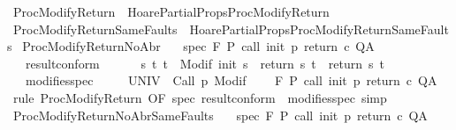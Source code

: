 \begin{isabellebody}
\isanewline
{}\isamarkupfalse%
\ ProcModifyReturn\ {\isacharequal}\ HoarePartialProps{\isachardot}ProcModifyReturn\ \isanewline
{}\isamarkupfalse%
\ ProcModifyReturnSameFaults\ {\isacharequal}\ HoarePartialProps{\isachardot}ProcModifyReturnSameFaults\isanewline
\isanewline
{}\isamarkupfalse%
\ ProcModifyReturnNoAbr{\isacharcolon}\isanewline
\ \ \ spec{\isacharcolon}\ {\isachardoublequoteopen}{\isasymGamma}{\isacharcomma}{\isasymTheta}{\isasymturnstile}\isactrlbsub {\isacharslash}F\isactrlesub \ P\ {\isacharparenleft}call\ init\ p\ return{\isacharprime}\ c{\isacharparenright}\ Q{\isacharcomma}A{\isachardoublequoteclose}\isanewline
\ \ \ result{\isacharunderscore}conform{\isacharcolon}\isanewline
\ \ \ \ \ \ {\isachardoublequoteopen}{\isasymforall}s\ t{\isachardot}\ t\ {\isasymin}\ Modif\ {\isacharparenleft}init\ s{\isacharparenright}\ {\isasymlongrightarrow}\ {\isacharparenleft}return{\isacharprime}\ s\ t{\isacharparenright}\ {\isacharequal}\ {\isacharparenleft}return\ s\ t{\isacharparenright}{\isachardoublequoteclose}\isanewline
\ \ \ modifies{\isacharunderscore}spec{\isacharcolon}\ \ \isanewline
\ \ {\isachardoublequoteopen}{\isasymforall}{\isasymsigma}{\isachardot}\ {\isasymGamma}{\isacharcomma}{\isasymTheta}{\isasymturnstile}\isactrlbsub {\isacharslash}UNIV\isactrlesub \ {\isacharbraceleft}{\isasymsigma}{\isacharbraceright}\ Call\ p\ {\isacharparenleft}Modif\ {\isasymsigma}{\isacharparenright}{\isacharcomma}{\isacharbraceleft}{\isacharbraceright}{\isachardoublequoteclose}\isanewline
\ \ \ {\isachardoublequoteopen}{\isasymGamma}{\isacharcomma}{\isasymTheta}{\isasymturnstile}\isactrlbsub {\isacharslash}F\isactrlesub \ P\ {\isacharparenleft}call\ init\ p\ return\ c{\isacharparenright}\ Q{\isacharcomma}A{\isachardoublequoteclose}\isanewline
%
\isadelimproof
%
\endisadelimproof
%
\isatagproof
{}\isamarkupfalse%
\ {\isacharparenleft}rule\ ProcModifyReturn\ {\isacharbrackleft}OF\ spec\ result{\isacharunderscore}conform\ {\isacharunderscore}\ modifies{\isacharunderscore}spec{\isacharbrackright}{\isacharparenright}\ simp%
\endisatagproof
{\isafoldproof}%
%
\isadelimproof
\isanewline
%
\endisadelimproof
\isanewline
{}\isamarkupfalse%
\ ProcModifyReturnNoAbrSameFaults{\isacharcolon}\isanewline
\ \ \ spec{\isacharcolon}\ {\isachardoublequoteopen}{\isasymGamma}{\isacharcomma}{\isasymTheta}{\isasymturnstile}\isactrlbsub {\isacharslash}F\isactrlesub \ P\ {\isacharparenleft}call\ init\ p\ return{\isacharprime}\ c{\isacharparenright}\ Q{\isacharcomma}A{\isachardoublequoteclose}\isanewline

\end{isabellebody}
